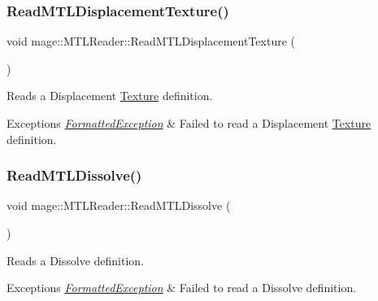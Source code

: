 \subsubsection{\texorpdfstring{Read\+M\+T\+L\+Displacement\+Texture()}{ReadMTLDisplacementTexture()}}
{\footnotesize\ttfamily void mage\+::\+M\+T\+L\+Reader\+::\+Read\+M\+T\+L\+Displacement\+Texture (\begin{DoxyParamCaption}{ }\end{DoxyParamCaption})\hspace{0.3cm}{\ttfamily [private]}}

Reads a Displacement \hyperlink{classmage_1_1_texture}{Texture} definition.


\begin{DoxyExceptions}{Exceptions}
{\em \hyperlink{structmage_1_1_formatted_exception}{Formatted\+Exception}} & Failed to read a Displacement \hyperlink{classmage_1_1_texture}{Texture} definition. \\
\hline
\end{DoxyExceptions}
\hypertarget{classmage_1_1_m_t_l_reader_a788a80ec60a2e50c1017630afb607f1c}{}\label{classmage_1_1_m_t_l_reader_a788a80ec60a2e50c1017630afb607f1c} 
\subsubsection{\texorpdfstring{Read\+M\+T\+L\+Dissolve()}{ReadMTLDissolve()}}
{\footnotesize\ttfamily void mage\+::\+M\+T\+L\+Reader\+::\+Read\+M\+T\+L\+Dissolve (\begin{DoxyParamCaption}{ }\end{DoxyParamCaption})\hspace{0.3cm}{\ttfamily [private]}}

Reads a Dissolve definition.


\begin{DoxyExceptions}{Exceptions}
{\em \hyperlink{structmage_1_1_formatted_exception}{Formatted\+Exception}} & Failed to read a Dissolve definition. \\
\hline
\end{DoxyExceptions}
\hypertarget{classmage_1_1_m_t_l_reader_aae7a327ad0c5223041c9e849ea2a88d7}{}\label{classmage_1_1_m_t_l_reader_aae7a327ad0c5223041c9e849ea2a88d7} 
